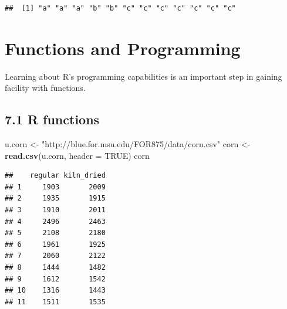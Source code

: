\documentclass[]{article}
\newenvironment{Shaded}{\begin{snugshade}}{\end{snugshade}}
\newcommand{\KeywordTok}[1]{\textcolor[rgb]{0.13,0.29,0.53}{\textbf{#1}}}
\newcommand{\DataTypeTok}[1]{\textcolor[rgb]{0.13,0.29,0.53}{#1}}
\newcommand{\StringTok}[1]{\textcolor[rgb]{0.31,0.60,0.02}{#1}}
\newcommand{\OtherTok}[1]{\textcolor[rgb]{0.56,0.35,0.01}{#1}}
\newcommand{\NormalTok}[1]{#1}
\begin{document}
\begin{verbatim}
##  [1] "a" "a" "a" "b" "b" "c" "c" "c" "c" "c" "c" "c"
\end{verbatim}

\section{Functions and Programming}\label{functions-and-programming}

Learning about R's programming capabilities is an important step in
gaining facility with functions.

\subsection{7.1 R functions}\label{r-functions}

\begin{Shaded}
\begin{Highlighting}[]
\NormalTok{u.corn <-}\StringTok{ "http://blue.for.msu.edu/FOR875/data/corn.csv"}
\NormalTok{corn <-}\StringTok{ }\KeywordTok{read.csv}\NormalTok{(u.corn, }\DataTypeTok{header =} \OtherTok{TRUE}\NormalTok{)}
\NormalTok{corn}
\end{Highlighting}
\end{Shaded}

\begin{verbatim}
##    regular kiln_dried
## 1     1903       2009
## 2     1935       1915
## 3     1910       2011
## 4     2496       2463
## 5     2108       2180
## 6     1961       1925
## 7     2060       2122
## 8     1444       1482
## 9     1612       1542
## 10    1316       1443
## 11    1511       1535
\end{verbatim}
\end{document}
